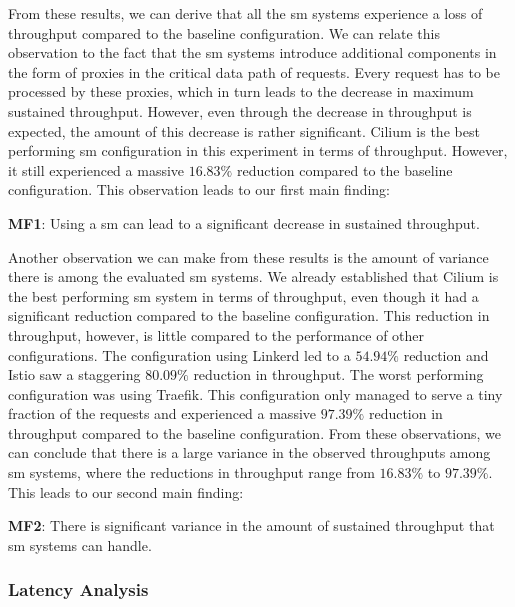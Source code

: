 From these results, we can derive that all the \gls{sm} systems experience a loss of throughput compared to the baseline configuration. We can relate this observation to the fact that the \gls{sm} systems introduce additional components in the form of proxies in the critical data path of requests. Every request has to be processed by these proxies, which in turn leads to the decrease in maximum sustained throughput. However, even through the decrease in throughput is expected, the amount of this decrease is rather significant. Cilium is the best performing \gls{sm} configuration in this experiment in terms of throughput. However, it still experienced a massive $16.83\%$ reduction compared to the baseline configuration. This observation leads to our first main finding: 

\begin{shaded*}
    \noindent
    \textbf{MF1}: 
    Using a \gls{sm} can lead to a significant decrease in sustained throughput.
\end{shaded*}

Another observation we can make from these results is the amount of variance there is among the evaluated \gls{sm} systems. We already established that Cilium is the best performing \gls{sm} system in terms of throughput, even though it had a significant reduction compared to the baseline configuration. This reduction in throughput, however, is little compared to the performance of other configurations. The configuration using Linkerd led to a $54.94\%$ reduction and Istio saw a staggering $80.09\%$ reduction in throughput. The worst performing configuration was using Traefik. This configuration only managed to serve a tiny fraction of the requests and experienced a massive $97.39\%$ reduction in throughput compared to the baseline configuration. From these observations, we can conclude that there is a large variance in the observed throughputs among \gls{sm} systems, where the reductions in throughput range from $16.83\%$ to $97.39\%$. This leads to our second main finding:

\begin{shaded*}
    \noindent
    \textbf{MF2}: 
    There is significant variance in the amount of sustained throughput that \gls{sm} systems can handle.
\end{shaded*}

\subsubsection{Latency Analysis}
\label{sec:experiments:results:per-experiment:01:latency}

